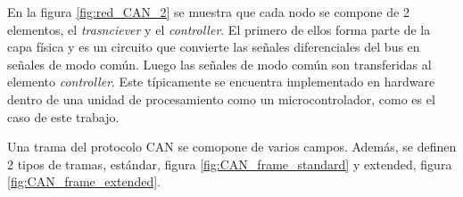 


En la figura \ref{fig:red_CAN_2} se muestra que cada nodo se compone de 2 elementos, el \textit{trasnciever} y el \textit{controller}. El primero de ellos forma parte de la capa física y es un circuito que convierte las señales diferenciales del bus en señales de modo común. Luego las señales de modo común son transferidas al elemento \textit{controller}. Este típicamente se encuentra implementado en hardware dentro de una unidad de procesamiento como un microcontrolador, como es el caso de este trabajo.



Una trama del protocolo CAN se comopone de varios campos. Además, se definen 2 tipos de tramas, estándar, figura \ref{fig:CAN_frame_standard} y extended, figura \ref{fig:CAN_frame_extended}.


